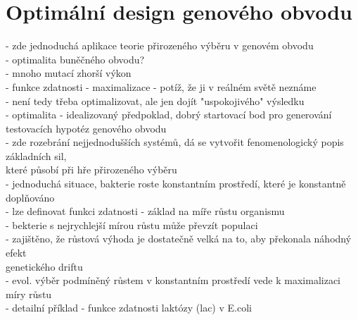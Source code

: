 \documentclass[11pt,a4paper]{report}
\begin{document}
\chapter{Optimální design genového obvodu}
- zde jednoduchá aplikace teorie přirozeného výběru v genovém obvodu\\
- optimalita buněčného obvodu?\\
\indent - mnoho mutací zhorší výkon\\
\indent - funkce zdatnosti - maximalizace - potíž, že ji v reálném světě neznáme\\
\indent \indent - není tedy třeba optimalizovat, ale jen dojít "uspokojivého" výsledku\\
- optimalita - idealizovaný předpoklad, dobrý startovací bod pro generování testovacích hypotéz genového obvodu\\
\indent - zde rozebrání nejjednodušších systémů, dá se vytvořit fenomenologický popis základních sil, \\
\indent \indent které působí při hře přirozeného výběru\\
- jednoduchá situace, bakterie roste konstantním prostředí, které je konstantně doplňováno\\
\indent - lze definovat funkci zdatnosti - základ na míře růstu organismu\\
\indent - bekterie s nejrychlejší mírou růstu může převzít populaci\\
\indent \indent - zajištěno, že růstová výhoda je dostatečně velká na to, aby překonala náhodný efekt\\
\indent \indent \indent genetického driftu\\
\indent \indent - evol. výběr podmíněný růstem v konstantním prostředí vede k maximalizaci míry růstu\\
- detailní příklad - funkce zdatnosti laktózy (lac) v E.coli\\
\end{document}
